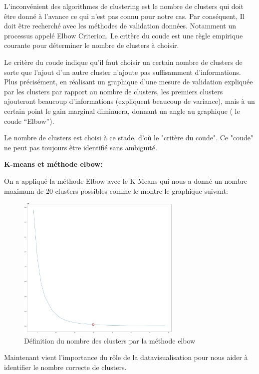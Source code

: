 \documentclass[12pt]{article}
\begin{document}
{L'inconvénient des algorithmes de clustering est le nombre de clusters qui doit être donné à l'avance ce qui n’est pas connu pour notre cas. Par conséquent, Il doit être recherché avec les méthodes de validation données. Notamment un processus appelé Elbow Criterion. Le critère du coude est une règle empirique courante pour déterminer le nombre de clusters à choisir.

Le critère du coude indique qu'il faut choisir un certain nombre de clusters de sorte que l'ajout d'un autre cluster n'ajoute pas suffisamment d'informations. 
Plus précisément, en réalisant un graphique d’une mesure de validation expliquée par les clusters par rapport au nombre de clusters, les premiers clusters ajouteront beaucoup d'informations (expliquent beaucoup de variance), mais à un certain point le gain marginal diminuera, donnant un angle au graphique ( le coude “Elbow”).

Le nombre de clusters est choisi à ce stade, d'où le "critère du coude". Ce "coude" ne peut pas toujours être identifié sans ambiguïté.

{\bf K-means et méthode elbow:}

On a appliqué la méthode Elbow avec le K Means qui nous a donné un nombre maximum de 20 clusters possibles comme le montre le graphique suivant:


\begin{figure}[H]
	\centering
    \includegraphics[width=0.7\textwidth]{image34.png}
     \caption{ Définition du nombre des clusters par la méthode elbow}
    \label{fig:34}
\end{figure}

Maintenant vient l’importance du rôle de la datavisualisation pour nous aider à identifier le nombre correcte de clusters.

}
\end{document}
